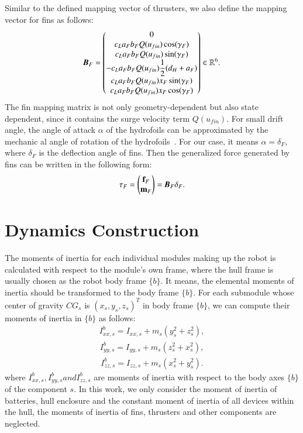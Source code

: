 Similar to the defined mapping vector of thrusters, we also define the mapping vector for fins as follows:
\begin{align}
\emph{\textbf{B}}_{F}=
\begin{pmatrix}
0\\c_{L}a_{F}b_{F}Q(u_{fin})\cos(\gamma_{F})\\
c_{L}a_{F}b_{F}Q(u_{fin})\sin(\gamma_{F})\\
-c_{L}a_{F}b_{F}Q(u_{fin})\dfrac{1}{2}(d_{H}+a_{F})\\
c_{L}a_{F}b_{F}Q(u_{fin})x_{F}\sin(\gamma_{F})\\
c_{L}a_{F}b_{F}Q(u_{fin})x_{F}\cos(\gamma_{F})
\end{pmatrix}\in \mathbb{R}^{6}.\label{EQ:FinMappingVector}
\end{align}
The fin mapping matrix is not only geometry-dependent but also state dependent, since it contains the surge velocity term $Q(u_{fin})$. For small drift angle, the angle of attack $\alpha$ of the hydrofoils can be approximated by the mechanic
al angle of rotation of the hydrofoils~\cite{Fossen2008}. For our case, it means $\alpha=\delta_{F}$, where $\delta_{F}$ is the deflection angle of fins. Then the generalized force generated by fins can be written in the following form:
\begin{align}
\vec{\tau}_{F}=
\begin{pmatrix}
\vec{f}_{F}\\ \vec{m}_{F}
\end{pmatrix}=
\emph{\textbf{B}}_{F}\delta_{F}.
\end{align}

\section{Dynamics Construction}
The moments of inertia for each individual modules making up the robot is calculated with respect to the module's own frame, where the hull frame is usually chosen as the robot body frame $\lbrace b \rbrace$. It means, the elemental moments of inertia should be transformed to the body frame $\lbrace b \rbrace$. For each submodule whose center of gravity $ CG_{s} $ is $(x_{s}, y_{s}, z_{s})^{T}$ in body frame $\lbrace b \rbrace$, we can compute their moments of inertia in $\lbrace b \rbrace$ as follows: 
\begin{align}
I_{xx,s}^{b}=I_{xx,s}+m_{s}(y_{s}^{2}+z_{s}^{2}),\label{EQ:MomentTransfer1}
\end{align}
\begin{align}
I_{yy,s}^{b}=I_{yy,s}+m_{s}(z_{s}^{2}+x_{s}^{2}),\label{EQ:MomentTransfer2}
\end{align}
\begin{align}
I_{zz,s}^{b}=I_{zz,s}+m_{s}(x_{s}^{2}+y_{s}^{2}).\label{EQ:MomentTransfer3}
\end{align}
where $I_{xx,s}^{b}, I_{yy,s}^{b} and I_{zz,s}^{b}$ are moments of inertia with respect to the body axes $\lbrace b \rbrace$ of the component $s$. In this work, we only consider the moment of inertia of batteries, hull enclosure and the constant moment of inertia of all devices within the hull, the moments of inertia of fins, thrusters and other components are neglected.

